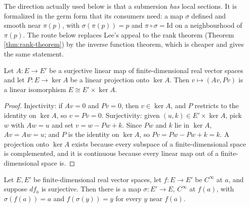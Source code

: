 The direction actually used below is that a submersion \emph{has} local sections. It is formalized in the germ form that its consumers need: a map $\sigma$ defined and smooth near $\pi(p)$, with $\sigma(\pi(p)) = p$ and $\pi \circ \sigma = \mathrm{Id}$ on a neighbourhood of $\pi(p)$. The route below replaces Lee's appeal to the rank theorem (Theorem \ref{thm:rank-theorem}) by the inverse function theorem, which is cheaper and gives the same statement.

\begin{lemma}
\label{lem:surjection-splits}




Let $A : E \to E'$ be a surjective linear map of finite-dimensional real vector spaces and let $P : E \to \ker A$ be a linear projection onto $\ker A$. Then $v \mapsto (Av, Pv)$ is a linear isomorphism $E \cong E' \times \ker A$.
\end{lemma}

\begin{proof}

Injectivity: if $Av = 0$ and $Pv = 0$, then $v \in \ker A$, and $P$ restricts to the identity on $\ker A$, so $v = Pv = 0$. Surjectivity: given $(u,k) \in E' \times \ker A$, pick $w$ with $Aw = u$ and set $v = w - Pw + k$. Since $Pw$ and $k$ lie in $\ker A$, $Av = Aw = u$; and $P$ is the identity on $\ker A$, so $Pv = Pw - Pw + k = k$. A projection onto $\ker A$ exists because every subspace of a finite-dimensional space is complemented, and it is continuous because every linear map out of a finite-dimensional space is.
\end{proof}

\begin{proposition}
\label{prop:local-section-euclidean}





Let $E, E'$ be finite-dimensional real vector spaces, let $f : E \to E'$ be $C^\infty$ at $a$, and suppose $df_a$ is surjective. Then there is a map $\sigma : E' \to E$, $C^\infty$ at $f(a)$, with $\sigma(f(a)) = a$ and $f(\sigma(y)) = y$ for every $y$ near $f(a)$.
\end{proposition}

